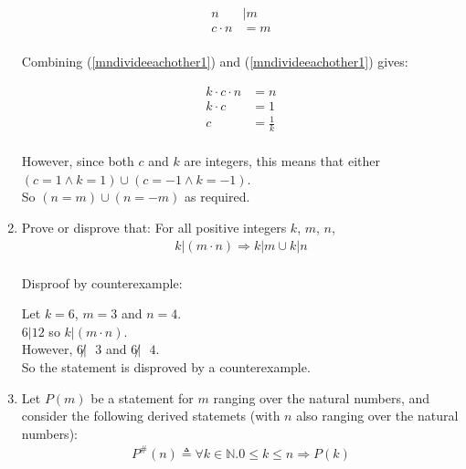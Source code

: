 \documentclass[10pt,\jkfside,a4paper]{article}
\begin{document}
\begin{enumerate}
\begin{equation}\label{mndivideeachother2}
\begin{split}
n &| m\\
c\cdot n &= m\\
\end{split}
\end{equation}

Combining (\ref{mndivideeachother1}) and (\ref{mndivideeachother1}) gives:

\begin{equation}\label{mndivideeachother2}
\begin{split}
k\cdot c\cdot n &= n\\
k\cdot c &= 1\\
c &= \frac{1}{k}\\
\end{split}
\end{equation}

However, since both $c$ and $k$ are integers, this means that either 
$(c=1 \wedge k=1) \cup (c=-1 \wedge k=-1)$. \\
So $(n = m) \cup (n = -m)$ as required.

\item Prove or disprove that: For all positive integers $k$, $m$, $n$,
\begin{equation}
\begin{split}
k|(m \cdot n) \Longrightarrow k|m \cup k|n\\
\end{split}
\end{equation}

Disproof by counterexample:

Let $k = 6$, $m = 3$ and $n = 4$.\\
$6|12$ so $k|(m\cdot n)$.\\
However, $6\not|\text{ }3$ and $6\not|\text{ }4$.\\
So the statement is disproved by a counterexample.

\item Let $P(m)$ be a statement for $m$ ranging over the natural numbers, 
and consider the following derived statemets (with $n$ also ranging over the 
natural numbers):
\begin{equation}
\begin{split}
P^\#(n)\triangleq \forall k \in \mathbb{N}. 0 \leqslant k \leqslant n \Longrightarrow P(k)\\
\end{split}
\end{equation}


\end{enumerate}
\end{document}
